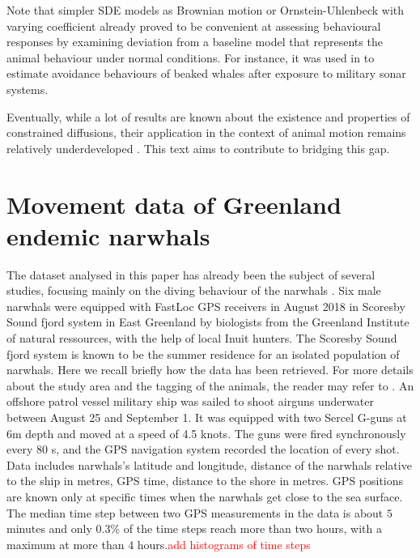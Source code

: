 \documentclass[11pt]{article}
\newcommand {\1}{\mathbb{1}}
\begin{document}
Note that simpler SDE models as Brownian motion or Ornstein-Uhlenbeck with varying coefficient already proved to be convenient at assessing behavioural responses by examining deviation from a baseline model that represents the animal behaviour under normal conditions. For instance, it was used in \cite{michelot_continuous-time_2022} to estimate avoidance behaviours of beaked whales after exposure to military sonar systems.


Eventually, while a lot of results are known about the existence and properties of constrained diffusions, their application in the context of animal motion remains relatively underdeveloped \cite{brillinger_simulating_2003}. This text aims to contribute to bridging this gap.
\newpage



\section{Movement data of Greenland endemic narwhals}
The dataset analysed in this paper has already been the subject of several studies, focusing mainly on the diving behaviour of the narwhals \cite{heide-jorgensen_behavioral_2021,tervo_narwhals_2021,ngo_understanding_2019}. 
Six male narwhals were equipped with FastLoc GPS receivers in August 2018 in Scoresby Sound fjord system in East Greenland by biologists from the Greenland Institute of natural ressources, with the help of local Inuit hunters. The Scoresby Sound fjord system
is known to be the summer residence for an isolated population of narwhals.
Here we recall briefly how the data has been retrieved. For more details about the study area and the tagging of the animals, the reader may refer to \cite{heide-jorgensen_behavioral_2021}. 
An offshore patrol vessel military ship was sailed to shoot airguns underwater between August 25 and September 1. It was equipped with two Sercel G-guns at 6m depth and moved at a speed of 4.5 knots. The guns were fired synchronously every 80 s,
and the GPS navigation system recorded the
location of every shot. 
Data includes narwhals's latitude and longitude, distance of the narwhals relative to the ship in metres, GPS time, distance to the shore in metres. GPS positions are known only at specific times when the narwhals get close to the sea surface. The median time step between two GPS measurements in the data is about $5$ minutes and only $0.3 \%$ of the time steps reach more than two hours, with a maximum at more than $4$ hours.\textcolor{red}{add histograms of time steps}\\
\end{document}
